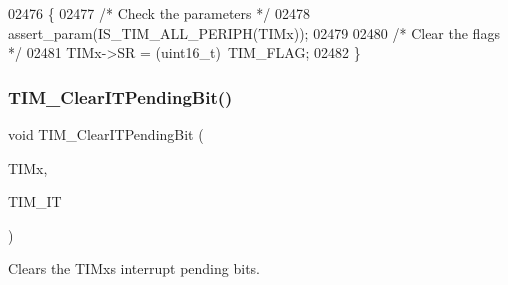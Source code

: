 \begin{DoxyCode}
02476 \{  
02477   \textcolor{comment}{/* Check the parameters */}
02478   assert_param(IS_TIM_ALL_PERIPH(TIMx));
02479    
02480   \textcolor{comment}{/* Clear the flags */}
02481   TIMx->SR = (uint16\_t)~TIM\_FLAG;
02482 \}
\end{DoxyCode}
\mbox{\label{group__TIM__Group5_ga9eb1e95af71ed380f51a2c6d585cc5d6}} 
\subsubsection{T\+I\+M\+\_\+\+Clear\+I\+T\+Pending\+Bit()}
{\footnotesize\ttfamily void T\+I\+M\+\_\+\+Clear\+I\+T\+Pending\+Bit (\begin{DoxyParamCaption}\item[{\textbf{ T\+I\+M\+\_\+\+Type\+Def} $\ast$}]{T\+I\+Mx,  }\item[{uint16\+\_\+t}]{T\+I\+M\+\_\+\+IT }\end{DoxyParamCaption})}



Clears the T\+I\+Mx\textquotesingle{}s interrupt pending bits. 



